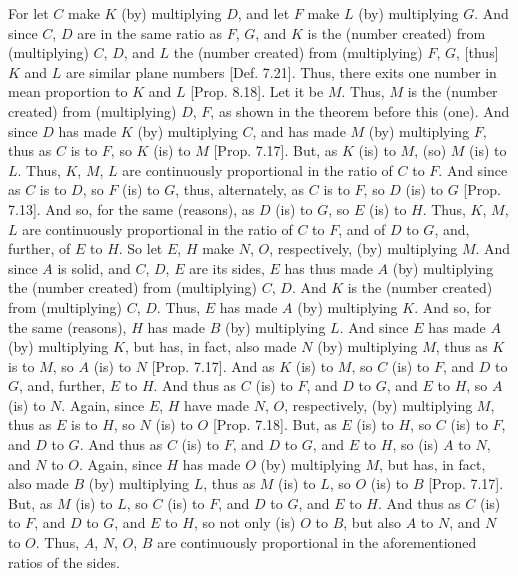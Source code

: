 \begin{Parallel}{}{}
{For let $C$ make $K$ (by) multiplying $D$, and let $F$ make $L$
(by) multiplying $G$. And since $C$, $D$ are in the same ratio as $F$, $G$,
and $K$ is the (number created) from (multiplying) $C$, $D$, and $L$ the (number created) from
(multiplying) $F$, $G$, [thus] $K$ and $L$ are  similar plane numbers [Def. 7.21]. Thus, there exits one number
in mean proportion to $K$ and $L$ [Prop. 8.18].
Let it be $M$. Thus, $M$ is the (number created) from (multiplying) $D$, $F$, as shown in the theorem before this (one). And since $D$ has made $K$ (by) multiplying $C$, and has made $M$ (by) multiplying $F$, thus as $C$ is to $F$, so
$K$ (is) to $M$ [Prop. 7.17]. But, as $K$ (is) to $M$, (so) $M$ (is) to $L$. Thus, $K$, $M$, $L$ are continuously
proportional in the ratio of $C$ to $F$. And since as $C$ is to $D$, so $F$
(is) to $G$, thus, alternately, as $C$ is to $F$, so $D$ (is) to $G$ [Prop. 7.13]. And so, for the same (reasons), 
as $D$ (is) to $G$, so $E$ (is) to $H$. Thus, $K$, $M$, $L$ are continuously
proportional in the ratio of $C$ to $F$, and of $D$ to $G$, and, further,  of $E$ to $H$. So let  $E$, $H$ make  $N$, $O$, respectively, (by) multiplying $M$. And since $A$ is  solid, and $C$, $D$, $E$ are its sides, $E$ has thus made $A$ (by) multiplying the (number created) from
(multiplying) $C$, $D$. And  $K$ 
is the (number created) from (multiplying)
$C$, $D$. Thus, $E$ has made $A$ (by) multiplying $K$. And so, for the
same (reasons), $H$ has made $B$ (by) multiplying $L$. And since
$E$ has made $A$ (by) multiplying $K$, but has, in fact, also made $N$ (by)
multiplying $M$, thus as $K$ is to $M$, so $A$ (is) to $N$ [Prop. 7.17].  And as $K$ (is) to $M$, so
$C$ (is) to $F$, and $D$ to $G$, and, further, $E$ to $H$. And thus as $C$
(is) to $F$, and $D$ to $G$, and $E$ to $H$, so $A$ (is) to $N$. Again, since
 $E$, $H$ have made  $N$, $O$, respectively, (by) multiplying $M$,
thus as $E$ is to $H$, so $N$ (is) to $O$ [Prop. 7.18]. But, as $E$ (is) to $H$, so $C$
(is) to $F$, and $D$ to $G$.  And thus as $C$ (is) to $F$, and $D$ to $G$,
and $E$ to $H$, so (is) $A$ to $N$, and $N$ to $O$. Again, since
$H$ has made $O$ (by) multiplying $M$, but  has, in fact, also made
$B$ (by) multiplying $L$, thus as $M$ (is) to $L$, so $O$ (is) to $B$ [Prop. 7.17]. But, as $M$ (is) to $L$, so $C$ (is)
to $F$, and $D$ to $G$, and $E$ to $H$. And thus as $C$ (is) to $F$,
and $D$ to $G$, and $E$ to $H$, so not only (is) $O$ to $B$, but
also $A$ to $N$, and $N$ to $O$. Thus,	 $A$, $N$, $O$, $B$ are continuously proportional in the aforementioned ratios of the sides.

}
\end{Parallel}
